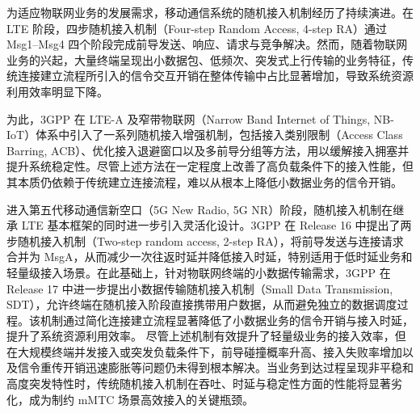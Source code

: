 为适应物联网业务的发展需求，移动通信系统的随机接入机制经历了持续演进。在 LTE 阶段，四步随机接入机制（Four-step Random Access, 4-step RA）通过 Msg1–Msg4 四个阶段完成前导发送、响应、请求与竞争解决\cite{2013_4gLTERA,3GPP_TS36321}。然而，随着物联网业务的兴起，大量终端呈现出小数据包、低频次、突发式上行传输的业务特征，传统连接建立流程所引入的信令交互开销在整体传输中占比显著增加，导致系统资源利用效率明显下降\cite{2013_LTE_mMTC}。

为此，3GPP 在 LTE-A 及窄带物联网（Narrow Band Internet of Things, NB-IoT）体系中引入了一系列随机接入增强机制，包括接入类别限制（Access Class Barring, ACB）、优化接入退避窗口以及多前导分组等方法，用以缓解接入拥塞并提升系统稳定性\cite{2012_ACB1,2016_UW,2016_multipreamble}。尽管上述方法在一定程度上改善了高负载条件下的接入性能，但其本质仍依赖于传统建立连接流程，难以从根本上降低小数据业务的信令开销。

进入第五代移动通信新空口（5G New Radio, 5G NR）阶段，随机接入机制在继承 LTE 基本框架的同时进一步引入灵活化设计。3GPP 在 Release 16 中提出了两步随机接入机制（Two-step random access, 2-step RA），将前导发送与连接请求合并为 MsgA，从而减少一次往返时延并降低接入时延\cite{2020_2stepRA}，特别适用于低时延业务和轻量级接入场景。在此基础上，针对物联网终端的小数据传输需求，3GPP 在 Release 17 中进一步提出小数据传输随机接入机制（Small Data Transmission, SDT），允许终端在随机接入阶段直接携带用户数据，从而避免独立的数据调度过程\cite{3GPP_TS38321_R17}。该机制通过简化连接建立流程显著降低了小数据业务的信令开销与接入时延，提升了系统资源利用效率。
尽管上述机制有效提升了轻量级业务的接入效率，但在大规模终端并发接入或突发负载条件下，前导碰撞概率升高、接入失败率增加以及信令重传开销迅速膨胀等问题仍未得到根本解决。当业务到达过程呈现非平稳和高度突发特性时，传统随机接入机制在吞吐、时延与稳定性方面的性能将显著劣化，成为制约 mMTC 场景高效接入的关键瓶颈。

